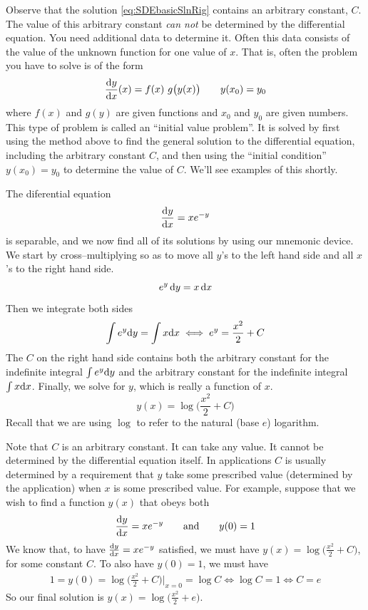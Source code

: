 Observe that the solution \eqref{eq:SDEbasicSlnRig} contains an arbitrary
constant, $C$. The value of this arbitrary constant \emph{can not}
be determined by the differential equation. You need additional data
to determine it. Often this data consists of the value of the unknown
function for one value of $x$. That is, often the problem you have to solve
is of the form
\begin{equation*}
\diff{y}{x}(x) = f(x)\ g\big(y(x)\big)\qquad y(x_0)=y_0
\end{equation*}
where $f(x)$ and $g(y)$ are given functions and $x_0$ and $y_0$ are
given numbers. This type of problem is called an ``initial value problem''.
It is solved by first using the method above to find the general solution
to the differential equation, including the arbitrary constant $C$,
and then using the ``initial condition'' $y(x_0)=y_0$ to determine the
value of $C$. We'll see examples of this shortly.

\begin{eg}\label{eg:SDEsdeAA}
The diferential equation
\begin{equation*}
\diff{y}{x} = xe^{-y}
\end{equation*}
is separable, and we now find all of its solutions by using our mnemonic
device. We start by cross--multiplying so as to move all $y$'s to the left
hand side and all $x$'s to the right hand side.
\begin{equation*}
e^y\,\mathrm{d}y = x\,\mathrm{d}x
\end{equation*}
Then we integrate both sides
\begin{equation*}
\int e^y\mathrm{d}y = \int x\mathrm{d}x
\iff e^y = \frac{x^2}{2}+C
\end{equation*}
The $C$ on the right hand side contains both the arbitrary constant
for the indefinite integral $\int e^y\mathrm{d}y$ and the arbitrary constant for
the indefinite integral  $\int x\mathrm{d}x$. Finally, we solve for $y$,
which is really a function of $x$.
\begin{equation*}
y(x) = \log\Big(\frac{x^2}{2}+C\Big)
\end{equation*}
Recall that we are using $\log$ to refer to the natural (base $e$)
logarithm.

Note that $C$ is an arbitrary constant. It can take any value. It cannot be
determined by the differential equation itself. In applications $C$ is usually
determined by a requirement that $y$ take some prescribed value (determined by the  application) when $x$ is some prescribed value. For example, suppose that we wish to find a function $y(x)$ that obeys both
\begin{equation*}
\diff{y}{x} = xe^{-y}\qquad\text{and}\qquad y(0)=1
\end{equation*}
We know that, to have $\diff{y}{x} = xe^{-y}$ satisfied, we must have
$y(x) = \log\big(\frac{x^2}{2}+C\big)$, for some constant $C$. To also have
$y(0)=1$, we must have
\begin{align*}
1=y(0)=\log\Big(\frac{x^2}{2}+C\Big)\bigg|_{x=0}=\log C
\iff \log C =1
\iff C=e
\end{align*}
So our final solution is $y(x) = \log\big(\frac{x^2}{2}+e\big)$.
\end{eg}



